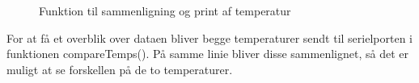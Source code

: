 \begin{figure}[h!]
  \centering
  \caption{Funktion til sammenligning og print af temperatur}
  \label{compareTemp}
\end{figure}
For at få et overblik over dataen bliver begge temperaturer sendt til serielporten i funktionen compareTemps(). På samme linie bliver disse sammenlignet, så det er muligt at se forskellen på de to temperaturer.



